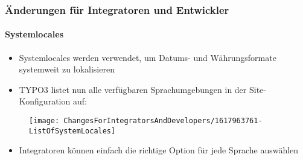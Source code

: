 %

\begin{frame}[fragile]
	\frametitle{Änderungen für Integratoren und Entwickler}
	\framesubtitle{Systemlocales}

	\begin{itemize}
		\item \smaller Systemlocales werden verwendet, um Datums- und Währungsformate systemweit zu lokalisieren \normalsize
		\item \smaller TYPO3 listet nun alle verfügbaren Sprachumgebungen in der Site-Konfiguration auf: \normalsize
	\end{itemize}

	\begin{figure}
		\texttt{[image: ChangesForIntegratorsAndDevelopers/1617963761-ListOfSystemLocales]}
	\end{figure}

	\begin{itemize}
		\item \smaller Integratoren können einfach die richtige Option für jede Sprache auswählen \normalsize
	\end{itemize}

\end{frame}

